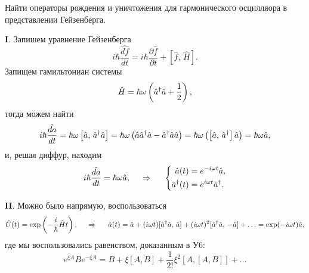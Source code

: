 
\begin{leftrules}
Найти операторы рождения и уничтожения для гармонического осцилляора в представлении Гейзенберга. 
\end{leftrules}


\textbf{I}. Запишем уравнение Гейзенберга
\begin{equation*}
    i \hbar \frac{\hat{d f}}{d t}  = i \hbar \frac{\partial \hat{f}}{\partial t} + \left[\hat{f},\, \hat{H}\right].
\end{equation*}
Запищем гамильтониан системы
\begin{equation*}
    \hat{H} = \hbar \omega \left(\hat{a}^{\dag} \hat{a} + \frac{1}{2}\right),
\end{equation*}
тогда можем найти
\begin{equation*}
    i \hbar \frac{\hat{d a}}{d t} = \hbar \omega \left[\hat{a},\, \hat{a}^{\dag} \hat{a}\right] = \hbar \omega \left(
        \hat{a} \hat{a}^{\dag} \hat{a} - \hat{a}^{\dag} \hat{a} \hat{a}
    \right) = \hbar \omega \left(
        \left[\hat{a},\, \hat{a}^{\dag}\right] \hat{a}
    \right) = \hbar \omega \hat{a},
\end{equation*}
и, решая диффур, находим
\begin{equation*}
    i \hbar \frac{\hat{d a}}{d t} = \hbar \omega \hat{a},
    \hspace{0.5cm} \Rightarrow \hspace{0.5cm}
    \left\{\begin{aligned}
        \hat{a}(t) &= e^{- i \omega t} \hat{a}, \\
        \hat{a}^{\dag}(t) &= e^{i \omega t} \hat{a}^{\dag}.
    \end{aligned}\right.
\end{equation*}

\textbf{II}. Можно было напрямую, воспользоваться
\begin{equation*}
    \hat{U}(t) = \exp\left(
        - \frac{i}{\hbar} \hat{H} t
    \right),
    \hspace{0.5cm} \Rightarrow \hspace{0.5cm}
    \hat{a}(t) = \hat{a} + (i \omega t) [
        \hat{a}^{\dag} \hat{a},\, \hat{a}
    ] + (i \omega t)^2 [\hat{a}^{\dag} \hat{a},\, -\hat{a}] + \ldots = \exp(- i \omega t) \hat{a}, 
\end{equation*}
где мы воспользовались равенством, доказанным в У6:
\begin{equation*}
    e^{\xi A} B e^{- \xi A} = B + \xi [A, B] + \frac{1}{2!} \xi^2 \left[A, [A, B]\right] + \ldots
\end{equation*}
